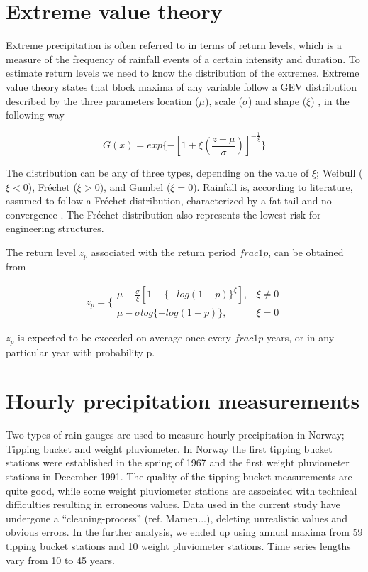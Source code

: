 \documentclass[12pt,a4paper,english]{article}
\begin{document}
\section{Extreme value theory}

Extreme precipitation is often referred to in terms of return levels, which is a measure of the frequency of rainfall events of a certain intensity and duration. To estimate return levels we need to know the distribution of the extremes. Extreme value theory states that block maxima of any variable follow a GEV distribution described by the three parameters location ($\mu$), scale ($\sigma$) and shape ($\xi$) \citep{Coles2001}, in the following way

\begin{equation}
G(x) = exp\{ - [1 + \xi(\frac{z - \mu}{\sigma})]^{-\frac{1}{\xi}}\}  
\end{equation}

\noindent The distribution can be any of three types, depending on the value of $\xi$; Weibull ($\xi<0$), Fr\'echet ($\xi>0$), and Gumbel ($\xi=0$). Rainfall is, according to literature, assumed to follow a Fr\'echet distribution, characterized by a fat tail and no convergence \citep{Wilks1993, KoutsoyiannisandBaloutsos2000, Katzetal2002, Colesetal2003, ColesandPericchi2003, Koutsoyiannis2004a}. The Fr\'echet distribution also represents the lowest risk for engineering structures.

The return level $z_p$ associated with the return period $frac{1}{p}$, can be obtained from

\begin{equation}
z_p = \Bigg\{ \begin{array}{lr} \mu - \frac{\sigma}{\xi}[1 - \{ - log(1 - p)\}^\xi], & \xi \neq 0\\
\mu - \sigma log\{ - log(1 - p)\}, & \xi = 0
\end{array}
\end{equation}

\noindent $z_p$ is expected to be exceeded on average once every $frac{1}{p}$ years, or in any particular year with probability p.

\section{Hourly precipitation measurements}

Two types of rain gauges are used to measure hourly precipitation in Norway; Tipping bucket and weight pluviometer. In Norway the first tipping bucket stations were established in the spring of 1967 and the first weight pluviometer stations in December 1991. The quality of the tipping bucket measurements are quite good, while some weight pluviometer stations are associated with technical difficulties resulting in erroneous values. Data used in the current study have undergone a ``cleaning-process'' (ref. Mamen...), deleting unrealistic values and obvious errors. In the further analysis, we ended up using annual maxima from 59 tipping bucket stations and 10 weight pluviometer stations. Time series lengths vary from 10 to 45 years.
\end{document}
